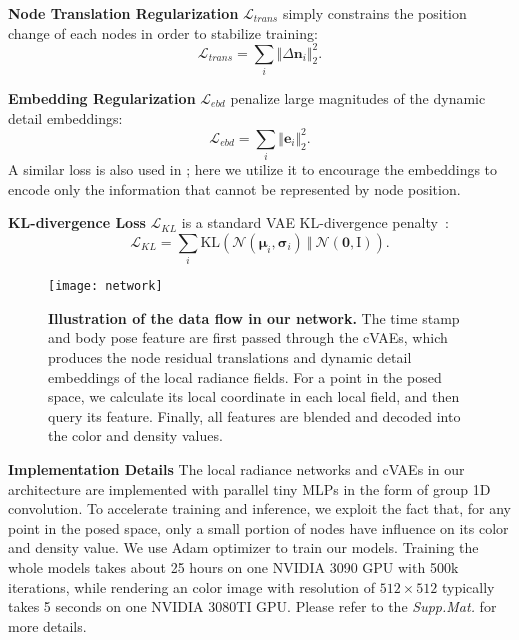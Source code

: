 \textbf{Node Translation Regularization} $\mathcal{L}_{trans}$ simply constrains the position change of each nodes in order to stabilize training: 
\begin{equation}
    \mathcal{L}_{trans} = \sum_i \Vert \Delta\bm{n}_i \Vert_2^2. 
\end{equation}

\textbf{Embedding Regularization} $\mathcal{L}_{ebd}$ penalize large magnitudes of the dynamic detail embeddings: 
\begin{equation}
    \mathcal{L}_{ebd} = \sum_i \Vert \bm{e}_i \Vert_2^2. 
\end{equation}
A similar loss is also used in \cite{park2019deepsdf}; here we utilize it to encourage the embeddings to encode only the information that cannot be represented by node position. 

\textbf{KL-divergence Loss} $\mathcal{L}_{KL}$ is a standard VAE KL-divergence penalty~\cite{kingma2014vae}:
\begin{equation}
    \mathcal{L}_{KL} = \sum_i \mathrm{KL}\left( \mathcal{N}(\bm{\mu}_i, \bm{\sigma}_i) \ \Vert\  \mathcal{N}(\bm{0}, \bm{\mathrm{I}})\right).
\end{equation}



\begin{figure}
    \centering
    \texttt{[image: network]}
    \caption{\textbf{Illustration of the data flow in our network.} The time stamp and body pose feature are first passed through the cVAEs, which produces the node residual translations and dynamic detail embeddings of the local radiance fields. For a point in the posed space, we calculate its local coordinate in each local field, and then query its feature. Finally, all features are blended and decoded into the color and density values.   }
    \label{fig:network}
\end{figure}





\noindent\textbf{Implementation Details}
The local radiance networks and cVAEs in our architecture are implemented with parallel tiny MLPs in the form of group 1D convolution.
To accelerate training and inference, we exploit the fact that, for any point in the posed space, only a small portion of nodes have influence on its color and density value. 
We use Adam optimizer to train our models. Training the whole models takes about 25 hours on one NVIDIA 3090 GPU with 500k iterations, while rendering an color image with resolution of $512\times 512$ typically takes 5 seconds on one NVIDIA 3080TI GPU. Please refer to the \textit{Supp.Mat.} for more details. 

